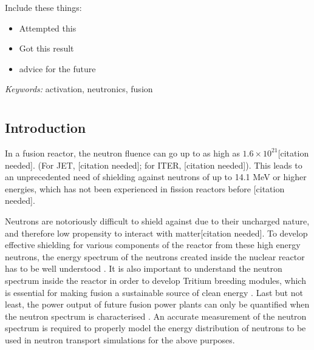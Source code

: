 \documentclass[a4paper, 12pt]{article}
\begin{document}
\abstract
Include these things:
\begin{itemize}
    \item Attempted this
    \item Got this result
    \item advice for the future
\end{itemize}
\emph{Keywords:} activation, neutronics, fusion
\pagebreak
\tableofcontents
\listoffigures
\pagebreak


\chapter{}
\section{Introduction}
    

In a fusion reactor, the neutron fluence can go up to as high as $1.6 \times 10^{21}$[citation needed]. (For JET, [citation needed]; for ITER, [citation needed]). This leads to an unprecedented need of shielding against neutrons of up to 14.1 MeV or higher energies, which has not been experienced in fission reactors before [citation needed].

Neutrons are notoriously difficult to shield against due to their uncharged nature, and therefore low propensity to interact with matter[citation needed]. To develop effective shielding for various components of the reactor from these high energy neutrons, the energy spectrum of the neutrons created inside the nuclear reactor has to be well understood \cite{TechnologicalExploitationOfDT}. It is also important to understand the neutron spectrum inside the reactor in order to develop Tritium breeding modules, which is essential for making fusion a sustainable source of clean energy \cite{TBMD_Design}. Last but not least, the power output of future fusion power plants can only be quantified when the neutron spectrum is characterised \cite{FusionYieldMeasurementOnJETAndTheirCalibration}.
An accurate measurement of the neutron spectrum is required to properly model the energy distribution of neutrons to be used in neutron transport simulations for the above purposes.
\end{document}
